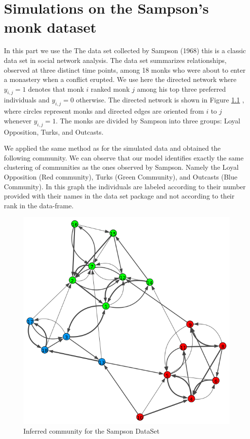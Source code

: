 \documentclass[12pt]{ociamthesis}  %
\begin{document}
	
	
	
	\chapter{Simulations on the Sampson’s monk dataset}
	In this part we use the The data set collected by Sampson (1968) this is a classic data set in social network analysis. The data set summarizes relationships, observed at three distinct time points, among 18 monks who were about to enter a monastery when a conflict erupted. We use here the directed network where $y_{i,j} = 1$ denotes that monk $i$ ranked monk $j$ among his top three preferred individuals and $y_{i,j} = 0$ otherwise. The directed network is shown in Figure \ref{label-image4} , where circles represent monks and directed edges are oriented from $i$ to $j$ whenever $y_{i,j} = 1$. The monks are divided by Sampson into three groups: Loyal Opposition, Turks, and Outcasts.
	
	We applied the same method as for the simulated data and obtained the following community. We can observe that our model identifies exactly the same clustering of communities as the ones observed by Sampson. Namely the Loyal Opposition (Red community), Turks (Green Community), and Outcasts (Blue Community). In this graph the individuals are labeled according to their number provided with their names in the data set package and not according to their rank in the data-frame.
	
	
	\begin{figure}
		\centering
		\includegraphics[width=\textwidth,height=\textheight,keepaspectratio]{OptimizationPlotSam}
		\caption{Inferred community for the Sampson DataSet}
		\label{label-image4}
	\end{figure}
	
	
	
\end{document}
